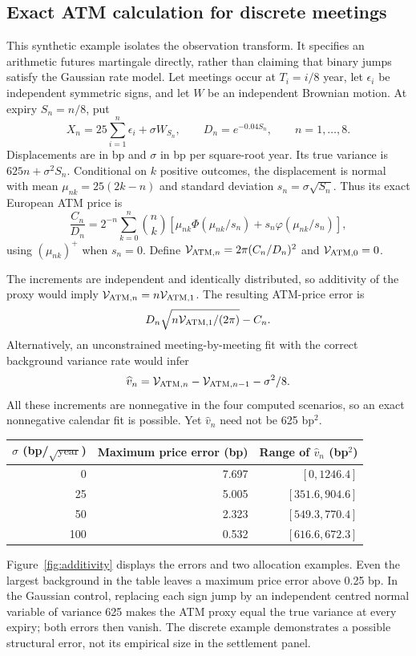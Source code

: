 \subsection{Exact ATM calculation for discrete meetings}\label{app:additivity}
This synthetic example isolates the observation transform. It specifies an arithmetic futures martingale directly, rather than claiming that binary jumps satisfy the Gaussian rate model. Let meetings occur at $T_i=i/8$ year, let $\epsilon_i$ be independent symmetric signs, and let $W$ be an independent Brownian motion. At expiry $S_n=n/8$, put
\[
X_n=25\sum_{i=1}^n\epsilon_i+\sigma W_{S_n},\qquad
D_n=e^{-0.04S_n},\qquad n=1,\ldots,8.
\]
Displacements are in bp and $\sigma$ in bp per square-root year. Its true variance is $625n+\sigma^2S_n$. Conditional on $k$ positive outcomes, the displacement is normal with mean $\mu_{nk}=25(2k-n)$ and standard deviation $s_n=\sigma\sqrt{S_n}$. Thus its exact European ATM price is
\[
\frac{C_n}{D_n}=2^{-n}\sum_{k=0}^n\binom nk
 \left[\mu_{nk}\Phi(\mu_{nk}/s_n)+s_n\varphi(\mu_{nk}/s_n)\right],
\]
using $(\mu_{nk})^+$ when $s_n=0$. Define $\mathcal V_{{\rm ATM},n}=2\pi(C_n/D_n)^2$ and $\mathcal V_{{\rm ATM},0}=0$.

The increments are independent and identically distributed, so additivity of the proxy would imply $\mathcal V_{{\rm ATM},n}=n\mathcal V_{{\rm ATM},1}$. The resulting ATM-price error is
\[
D_n\sqrt{n\mathcal V_{{\rm ATM},1}/(2\pi)}-C_n.
\]
Alternatively, an unconstrained meeting-by-meeting fit with the correct background variance rate would infer
\[
\widehat v_n=\mathcal V_{{\rm ATM},n}-\mathcal V_{{\rm ATM},n-1}-\sigma^2/8.
\]
All these increments are nonnegative in the four computed scenarios, so an exact nonnegative calendar fit is possible. Yet $\widehat v_n$ need not be 625 bp$^2$.

\begin{center}\small
\begin{tabular}{rrr}
\toprule
$\sigma$ (bp/$\sqrt{\mathrm{year}}$) & Maximum price error (bp) & Range of $\widehat v_n$ (bp$^2$)\\
\midrule
0 & 7.697 & $[0,1246.4]$\\
25 & 5.005 & $[351.6,904.6]$\\
50 & 2.323 & $[549.3,770.4]$\\
100 & 0.532 & $[616.6,672.3]$\\
\bottomrule
\end{tabular}
\end{center}
Figure~\ref{fig:additivity} displays the errors and two allocation examples. Even the largest background in the table leaves a maximum price error above 0.25 bp. In the Gaussian control, replacing each sign jump by an independent centred normal variable of variance 625 makes the ATM proxy equal the true variance at every expiry; both errors then vanish. The discrete example demonstrates a possible structural error, not its empirical size in the settlement panel.

